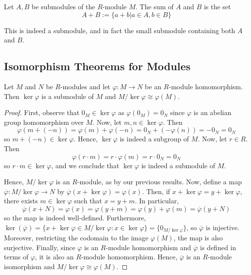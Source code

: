 \documentclass[12pt, a4paper, oneside, openright, titlepage]{book}
\begin{document}
\begin{defn}
    Let $A,B$ be submodules of the $R$-module $M$. The sum of $A$ and $B$ is the set \begin{equation*}
        A+B := \{a+b\vert a\in A, b \in B\}
    \end{equation*}
\end{defn}

This is indeed a submodule, and in fact the small submodule containing both $A$ and $B$.

\subsection{\textsection Isomorphism Theorems for Modules}

\begin{namthm}\label{thmname:fisomod}
    Let $M$ and $N$ be $R$-modules and let $\varphi:M\rightarrow N$ be an $R$-module homomorphism. Then $\ker\varphi$ is a submodule of $M$ and $M/\ker\varphi\cong \varphi(M)$.
\end{namthm}
\begin{proof}
    First, observe that $0_M \in \ker \varphi$ as $\varphi(0_M) = 0_N$ since $\varphi$ is an abelian group homomorphism over $M$. Now, let $m,n \in \ker\varphi$. Then \begin{equation*}
        \varphi(m+(-n)) = \varphi(m)+\varphi(-n) = 0_N+(-\varphi(n)) = -0_N = 0_N
    \end{equation*}
    so $m+(-n) \in \ker\varphi$. Hence, $\ker\varphi$ is indeed a subgroup of $M$. Now, let $r \in R$. Then $$\varphi(r\cdot m) = r\cdot \varphi(m) = r\cdot 0_N = 0_N$$
    so $r\cdot m \in \ker\varphi$, and we conclude that $\ker\varphi$ is indeed a submodule of $M$.

    Hence, $M/\ker\varphi$ is an $R$-module, as by our previous results. Now, define a map $\overline{\varphi}:M/\ker\varphi\rightarrow N$ by $\overline{\varphi}(x+\ker\varphi) = \varphi(x)$. Then, if $x+\ker\varphi = y + \ker\varphi$, there exists $m \in \ker\varphi$ such that $x= y + m$. In particular, \begin{equation*}
        \overline{\varphi}(x+N) = \varphi(x) = \varphi(y+m) = \varphi(y)+\varphi(m)= \overline{\varphi}(y+N)
    \end{equation*}
    so the map is indeed well-defined. Furthermore, $\ker(\overline{\varphi}) = \{x+\ker\varphi\in M/\ker\varphi:x \in \ker\varphi\} = \{0_{M/\ker\varphi}\}$, so $\overline{\varphi}$ is injective. Moreover, restricting the codomain to the image $\varphi(M)$, the map is also surjective. Finally, since $\varphi$ is an $R$-module homomorphism and $\overline{\varphi}$ is defined in terms of $\varphi$, it is also an $R$-module homomorphism. Hence, $\overline{\varphi}$ is an $R$-module isomorphism and $M/\ker\varphi\cong\varphi(M)$. 
\end{proof}
\end{document}

